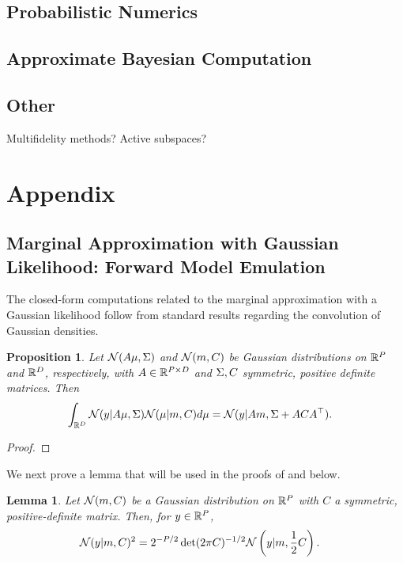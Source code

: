 \documentclass[12pt]{article}
\newtheorem{prop}{Proposition}
\newtheorem{lemma}{Lemma}
\begin{document}
\subsection{Probabilistic Numerics} \label{sec:prob-numerics}

\subsection{Approximate Bayesian Computation} \label{sec:abc}

\subsection{Other}
Multifidelity methods? Active subspaces?

\section{Appendix}

\subsection{Marginal Approximation with Gaussian Likelihood: Forward Model Emulation}
The closed-form computations related to the marginal approximation with a Gaussian 
likelihood follow from standard results regarding the convolution of Gaussian densities.  

\begin{prop} \label{Gaussian_convolution}
Let $\mathcal{N}(A \mu, \Sigma)$ and $\mathcal{N}(m, C)$ be Gaussian distributions on $\mathbb{R}^{P}$ and $\mathbb{R}^{D}$, 
respectively, with $A \in \mathbb{R}^{P \times D}$ and $\Sigma, C$ symmetric, positive definite matrices. Then 
\begin{align*}
\int_{\mathbb{R}^{D}} \mathcal{N}(y | A \mu, \Sigma) \mathcal{N}(\mu | m, C) d\mu
&= \mathcal{N}(y | Am, \Sigma + ACA^\top). 
\end{align*}
\end{prop}

\begin{proof} 
\todo
\end{proof}

We next prove a lemma that will be used in the proofs of  
and  below. 
\begin{lemma} \label{lemma:squared_Gaussian_density}
Let $\mathcal{N}(m, C)$ be a Gaussian distribution on $\mathbb{R}^{P}$ with $C$ a symmetric, positive-definite 
matrix. Then, for $y \in \mathbb{R}^{P}$, 
\begin{align*}
\mathcal{N}(y | m, C)^2 
&= 2^{-P/2} \det(2\pi C)^{-1/2} \mathcal{N}\left(y | m, \frac{1}{2}C\right). 
\end{align*}
\end{lemma}
\end{document}
